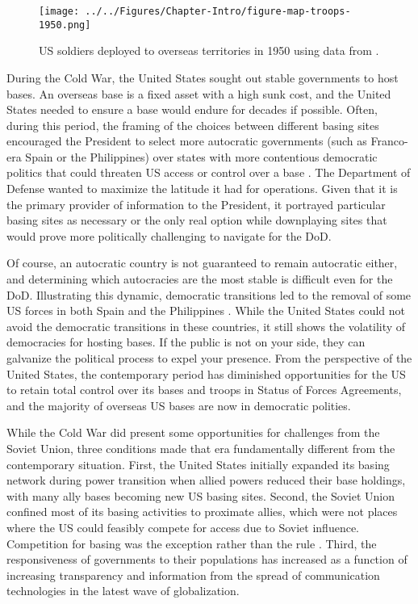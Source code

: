 \begin{figure}[t]
	\centering\texttt{[image: ../../Figures/Chapter-Intro/figure-map-troops-1950.png]}
	\caption{US soldiers deployed to overseas territories in 1950 using data from \cite{Kane2004}.}
	\label{fig:intromap1}
\end{figure}


During the Cold War, the United States sought out stable governments to host bases. An overseas base is a fixed asset with a high sunk cost, and the United States needed to ensure a base would endure for decades if possible.  Often, during this period, the framing of the choices between different basing sites encouraged the President to select more autocratic governments (such as Franco-era Spain or the Philippines) over states with more contentious democratic politics that could threaten US access or control over a base \cite{Halperin2007}. The Department of Defense wanted to maximize the latitude it had for operations. Given that it is the primary provider of information to the President, it portrayed particular basing sites as necessary or the only real option while downplaying sites that would prove more politically challenging to navigate for the DoD. 

Of course, an autocratic country is not guaranteed to remain autocratic either, and determining which autocracies are the most stable is difficult even for the DoD. Illustrating this dynamic, democratic transitions led to the removal of some US forces in both Spain and the Philippines \cite{cooley2008}. While the United States could not avoid the democratic transitions in these countries, it still shows the volatility of democracies for hosting bases. If the public is not on your side, they can galvanize the political process to expel your presence.  From the perspective of the United States, the contemporary period has diminished opportunities for the US to retain total control over its bases and troops in Status of Forces Agreements, and the majority of overseas US bases are now in democratic polities. 

While the Cold War did present some opportunities for challenges from the Soviet Union, three conditions made that era fundamentally different from the contemporary situation. First, the United States initially expanded its basing network during power transition when allied powers reduced their base holdings, with many ally bases becoming new US basing sites. Second, the Soviet Union confined most of its basing activities to proximate allies, which were not places where the US could feasibly compete for access due to Soviet influence. Competition for basing was the exception rather than the rule \cite{Nieman2020}. Third, the responsiveness of governments to their populations has increased as a function of increasing transparency and information from the spread of communication technologies in the latest wave of globalization.

